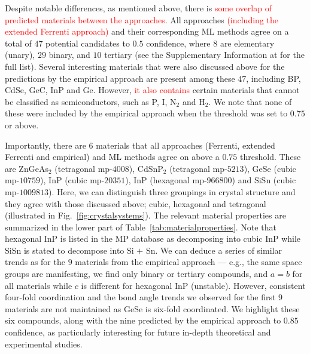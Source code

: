\documentclass[superscriptaddress,unsortedaddress,
 amsmath,amssymb,
 aps,
]{revtex4-2}
\newcommand{\mrk}[1]{\textcolor{red}{#1}}
\begin{document}
Despite notable differences, as mentioned above, there is \mrk{some overlap of predicted materials between the approaches}. 
All approaches \mrk{(including the extended Ferrenti approach)} and their corresponding ML methods agree on a total of $47$ potential candidates to $0.5$ confidence, where $8$ are elementary (unary), $29$ binary, and $10$ tertiary (see the Supplementary Information at \cite{supplementary} for the full list). 
Several interesting materials that were also discussed above for the predictions by the empirical approach are present among these $47$, including BP, CdSe, GeC, InP and Ge. However, \mrk{it also contains} certain materials that cannot be classified as semiconductors, such as P, I, N$_2$ and H$_2$. We note that none of these were included by the empirical approach when the threshold was set to $0.75$ or above. 

Importantly, there are $6$ materials that all approaches (Ferrenti, extended Ferrenti and empirical) and ML methods agree on above a $0.75$ threshold. These are ZnGeAs$_2$ (tetragonal mp-$4008$), CdSnP$_2$ (tetragonal mp-$5213$), GeSe (cubic mp-$10759$), InP (cubic mp-$20351$), InP (hexagonal mp-$966800$) and SiSn (cubic mp-$1009813$). Here, we can distinguish three groupings in crystal structure and they agree with those discussed above; cubic, hexagonal and tetragonal (illustrated in Fig.~\ref{fig:crystalsystems}). The relevant material properties are summarized in the lower part of Table~\ref{tab:materialproperties}. 
Note that hexagonal InP is listed in the MP database as decomposing into cubic InP while SiSn is stated to decompose into Si $+$ Sn. 
We can deduce a series of similar trends as for the $9$ materials from the empirical approach --- e.g., the same space groups are manifesting, we find only binary or tertiary compounds, and $a=b$ for all materials while $c$ is different for hexagonal InP (unstable). However, consistent four-fold coordination and the bond angle trends we observed for the first $9$ materials are not maintained as GeSe is six-fold coordinated. 
We highlight these six compounds, along with the nine predicted by the empirical approach to $0.85$ confidence, as particularly interesting for future in-depth theoretical and experimental studies. 
\end{document}
